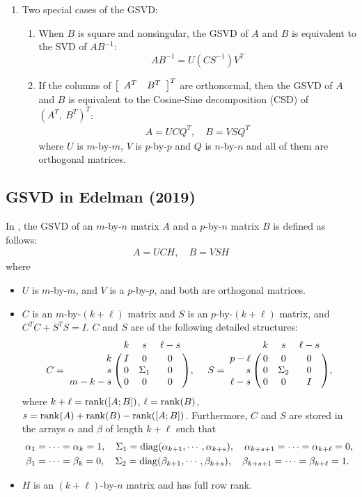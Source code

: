\begin{enumerate}
\item Two special cases of the GSVD:
\begin{enumerate}
\item When $B$ is square and nonsingular, the GSVD
of $A$ and $B$ is equivalent to the SVD of $AB^{-1}$:
\[
A B^{-1} = U (CS^{-1}) V^T  
\]
                
\item If the columns of $\left[ \begin{array}{cc} A^T & B^T \end{array} \right]^T$ are orthonormal, then 
the GSVD of $A$ and $B$ is equivalent to the 
Cosine-Sine decomposition (CSD) of $(A^T, \ B^T)^T$:
\begin{align}
A = UCQ^T, \quad 
B = VSQ^T
\end{align}
where $U$ is $m$-by-$m$, $V$ is $p$-by-$p$ and $Q$ is $n$-by-$n$ 
and all of them are orthogonal matrices.
\end{enumerate}
\end{enumerate}


\newpage 
\subsection{GSVD in Edelman (2019)} 

In \cite{edelman2019gsvd}, the GSVD of an $m$-by-$n$ matrix $A$ 
and a $p$-by-$n$ matrix $B$ is defined as follows:
\begin{align} \label{eq:gsvdbyedelman}
A = UCH, \quad B = VSH
\end{align}
where 
\begin{itemize}
\item $U$ is $m$-by-$m$, and $V$ is a $p$-by-$p$, and both 
are orthogonal matrices. 

\item $C$ is an $m$-by-$(k+\ell)$ matrix and $S$ is 
an $p$-by-$(k+\ell)$ matrix, and  $C^T C + S^T S = I$. 
$C$ and $S$ are of the following detailed structures: 
\[
C = \bordermatrix{ & k & s & \ell-s  \cr
            \hfill k & I & 0 & 0\cr
            \hfill s & 0 & \Sigma_1 & 0\cr
            \hfill m-k-s & 0 & 0 & 0}, \  \ \ \
S = \bordermatrix{ & k & s & \ell-s \cr
            \hfill p-\ell & 0 & 0 & 0\cr
            \hfill s & 0 & \Sigma_2 & 0\cr
            \hfill \ell-s & 0 & 0 & I}, 
\]
where 
$k+\ell = \operatorname{rank}([A; B])$, 
$\ell = \operatorname{rank}(B)$,  
$s = \operatorname{rank}(A) + \operatorname{rank}(B) - \operatorname{rank}([A; B])$. Furthermore, 
$C$ and $S$ are stored in the arrays $\alpha$ and $\beta$
of length $k+\ell$ such that 
\begin{align*} 
\alpha_1 & = \cdots = \alpha_k = 1, \quad 
\Sigma_1 = \operatorname{diag}(\alpha_{k+1}, \cdots, \alpha_{k+s}), \quad 
\alpha_{k+s+1} = \cdots = \alpha_{k+\ell} = 0, \\ 
\beta_1 & = \cdots = \beta_k = 0, \quad 
\Sigma_2 = \operatorname{diag}(\beta_{k+1}, \cdots, \beta_{k+s}), \quad 
\beta_{k+s+1} = \cdots = \beta_{k+\ell} = 1. 
\end{align*} 

\item $H$ is an $(k+\ell)$-by-$n$ matrix and has full row rank.

\end{itemize}

